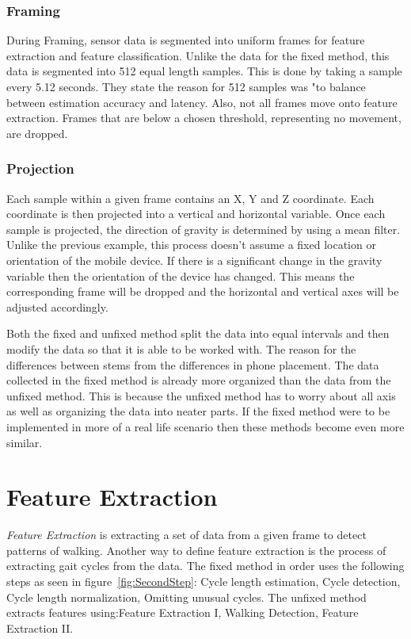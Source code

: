 \documentclass{sig-alternate}
\begin{document}
\subsubsection{Framing}{
 During Framing, sensor data is segmented into uniform frames for feature extraction and feature classification. Unlike the data for the fixed method, this data is segmented into 512 equal length samples. This is done by taking a sample every 5.12 seconds. They state the reason for 512 samples was "to balance between estimation accuracy and latency. Also, not all frames move onto feature extraction. Frames that are below a chosen threshold, representing no movement, are dropped. 
 }
\subsubsection{Projection}{
Each sample within a given frame contains an X, Y and Z coordinate. Each coordinate is then projected into a vertical and horizontal variable. Once each sample is projected, the direction of gravity is determined by using a mean filter. Unlike the previous example, this process doesn't assume a fixed location or orientation of the mobile device. If there is a significant change in the gravity variable then the orientation of the device has changed. This means the corresponding frame will be dropped and the horizontal and vertical axes will be adjusted accordingly. 
}

Both the fixed and unfixed method split the data into equal intervals and then modify the data so that it is able to be worked with. The reason for the differences between stems from the differences in phone placement. The data collected in the fixed method is already more organized than the data from the unfixed method. This is because the unfixed method has to worry about all axis as well as organizing the data into neater parts. If the fixed method were to be implemented in more of a real life scenario then these methods become even more similar. 

\section{Feature Extraction}
	\textit{Feature Extraction} is extracting a set of data from a given frame to detect patterns of walking. Another way to define feature extraction is the process of extracting gait cycles from the data. The fixed method in order uses the following steps as seen in figure~\ref{fig:SecondStep}: Cycle length estimation, Cycle detection, Cycle length normalization, Omitting unusual cycles. The unfixed method extracts features using:Feature Extraction I, Walking Detection, Feature Extraction II.  
\end{document}
